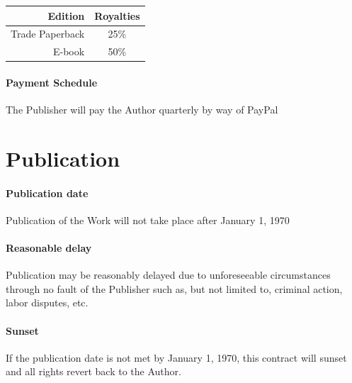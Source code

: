 \documentclass[12pt,letterpaper]{article}
\def\PrintRoyalties{25\%}
\def\DigitalRoyalties{50\%}
\def\PaymentMechanism{PayPal} %
\def\PublicationDate{January 1, 1970}
\begin{document}
\begin{center}
\begin{tabular}{r c}
    \textbf{Edition} & \textbf{Royalties} \\ \hline
    Trade Paperback & \PrintRoyalties \\
    E-book & \DigitalRoyalties \\
    \hline
\end{tabular}
\end{center}

\paragraph{Payment Schedule}

The Publisher will pay the Author quarterly by way of \PaymentMechanism

\section{Publication}

\paragraph{Publication date}

Publication of the Work will not take place after \PublicationDate

\paragraph{Reasonable delay}

Publication may be reasonably delayed due to unforeseeable circumstances through no fault of the Publisher such as, but not limited to, criminal action, labor disputes, etc.

\paragraph{Sunset}

If the publication date is not met by \PublicationDate, this contract will sunset and all rights revert back to the Author.
\end{document}
